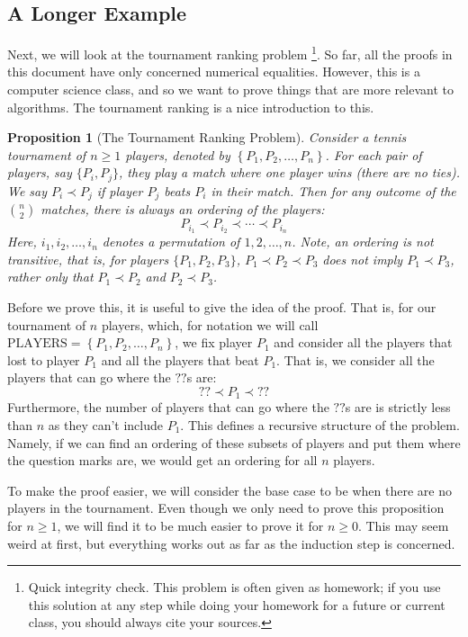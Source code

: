 \documentclass{article}
\theoremstyle{plain}
\newtheorem{proposition}{Proposition}
\theoremstyle{definition}
\begin{document}
\subsection{A Longer Example}

Next, we will look at the tournament ranking problem 
\footnote{Quick integrity check. This problem is often given as homework; if you use this solution at any step while doing your homework for a future or current class, you should always cite your sources.}.
So far, all the proofs in this document have only concerned numerical equalities. However, this is a computer science class, and so we want to prove things that are more relevant to algorithms. The tournament ranking is a nice introduction to this.

\begin{proposition}[The Tournament Ranking Problem]
    Consider a tennis tournament of \(n \geq 1\) players, denoted by \(\left\{P_1, P_2, \dotsc, P_n\right\}\). For each pair of players, say \(\{P_i, P_j\}\), they play a match where one player wins (there are no ties). We say \(P_i \prec P_j\) if player \(P_j\) beats \(P_i\) in their match. Then for any outcome of the \(\binom{n}{2}\) matches, there is always an ordering of the players:
    \[P_{i_1} \prec P_{i_2} \prec \cdots \prec P_{i_n}\]
    Here, \(i_1, i_2, \dotsc, i_n\) denotes a permutation of \(1, 2, \dotsc, n\). Note, an ordering is \emph{not} transitive, that is, for players \(\{P_1, P_2, P_3\}\), \(P_1 \prec P_2 \prec P_3\) does \emph{not} imply \(P_1 \prec P_3\), rather only that \(P_1 \prec P_2\) and \(P_2 \prec P_3\).
\end{proposition}

\phantom{ignore me}

Before we prove this, it is useful to give the idea of the proof. That is, for our tournament of \(n\) players, which, for notation we will call \(\text{PLAYERS} = \left\{P_1, P_2, \dotsc, P_n\right\}\), we fix player \(P_1\) and consider all the players that lost to player \(P_1\) and all the players that beat \(P_1\). That is, we consider all the players that can go where the \(??\)s are:
\[?? \prec P_1 \prec ??\]
Furthermore, the number of players that can go where the \(??\)s are is strictly less than \(n\) as they can't include \(P_1\). This defines a recursive structure of the problem. Namely, if we can find an ordering of these subsets of players and put them where the question marks are, we would get an ordering for all \(n\) players.

To make the proof easier, we will consider the base case to be when there are no players in the tournament. Even though we only need to prove this proposition for \(n \geq 1\), we will find it to be much easier to prove it for \(n \geq 0\). This may seem weird at first, but everything works out as far as the induction step is concerned.
\end{document}
